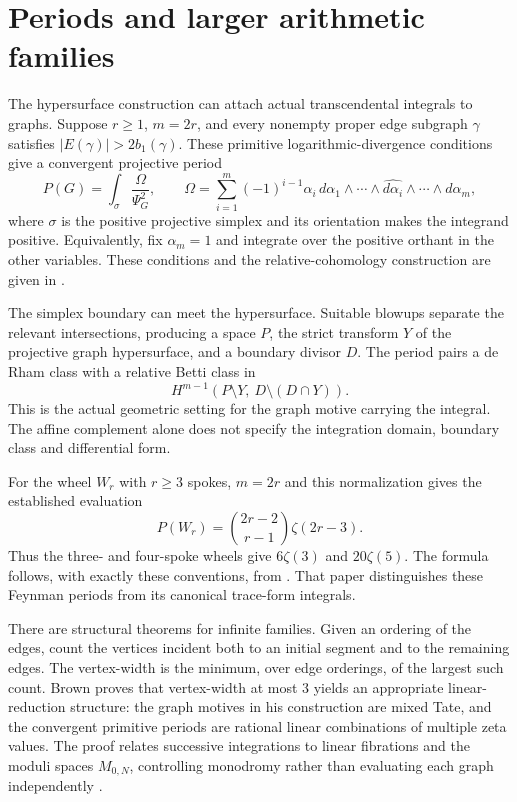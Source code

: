 \documentclass[11pt]{article}
\theoremstyle{definition}
\theoremstyle{remark}
\begin{document}
\section{Periods and larger arithmetic families}
\label{sec:graph-period-families}

The hypersurface construction can attach actual transcendental integrals
to graphs.  Suppose $r\ge1$, $m=2r$, and every nonempty proper edge subgraph
$\gamma$ satisfies $|E(\gamma)|>2b_1(\gamma)$.  These primitive
logarithmic-divergence conditions give a convergent projective period
\[
  P(G)=\int_{\sigma}\frac{\Omega}{\Psi_G^2},\qquad
  \Omega=\sum_{i=1}^{m}(-1)^{i-1}\alpha_i\,
     d\alpha_1\wedge\cdots\wedge\widehat{d\alpha_i}
     \wedge\cdots\wedge d\alpha_m,
\]
where $\sigma$ is the positive projective simplex and its orientation
makes the integrand positive.  Equivalently, fix $\alpha_m=1$ and
integrate over the positive orthant in the other variables.  These
conditions and the relative-cohomology construction are given in
\cite[\S5, \S7]{BEKGraphPolynomials}.

The simplex boundary can meet the hypersurface.  Suitable blowups separate
the relevant intersections, producing a space $P$, the strict transform
$Y$ of the projective graph hypersurface, and a boundary divisor $D$.
The period pairs a de Rham class with a relative Betti class in
\[
  H^{m-1}(P\setminus Y,\ D\setminus(D\cap Y)).
\]
This is the actual geometric setting for the graph motive carrying the
integral.  The affine complement alone does not specify the integration
domain, boundary class and differential form.

For the wheel $W_r$ with $r\ge3$ spokes, $m=2r$ and this normalization
gives the established evaluation
\[
  P(W_r)=\binom{2r-2}{r-1}\zeta(2r-3).
\]
Thus the three- and four-spoke wheels give $6\zeta(3)$ and
$20\zeta(5)$.  The formula follows, with exactly these conventions, from
\cite[Definition 61, Theorem 62 with $k=1$]{BrownSchnetzWheelClasses}.
That paper distinguishes these Feynman periods from its canonical
trace-form integrals.

There are structural theorems for infinite families.  Given an ordering
of the edges, count the vertices incident both to an initial segment and
to the remaining edges.  The vertex-width is the minimum, over edge
orderings, of the largest such count.  Brown proves that vertex-width
at most $3$ yields an appropriate linear-reduction structure: the graph
motives in his construction are mixed Tate, and the convergent primitive
periods are rational linear combinations of multiple zeta values.
The proof relates successive integrations to linear fibrations and
the moduli spaces $M_{0,N}$, controlling monodromy rather than evaluating
each graph independently
\cite[Introduction, Theorems 1--3]{BrownFeynmanPeriods}.
\end{document}
